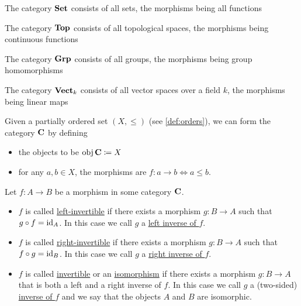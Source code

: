 \begin{definition}\label{def:standard_categories}
  \begin{defenum}
    \item\label{def:standard_categories/set} The category $\operatorname{\mathbf{Set}}$ consists of all sets, the morphisms being all functions
    \item\label{def:standard_categories/top} The category $\operatorname{\mathbf{Top}}$ consists of all topological spaces, the morphisms being continuous functions
    \item\label{def:standard_categories/grp} The category $\operatorname{\mathbf{Grp}}$ consists of all groups, the morphisms being group homomorphisms
    \item\label{def:standard_categories/vect} The category $\operatorname{\mathbf{Vect}}_k$ consists of all vector spaces over a field $k$, the morphisms being linear maps
    \item\label{def:standard_categories/ord} Given a partially ordered set $(X, \leq)$ (see \cref{def:orders}), we can form the category $\operatorname{\mathbf{C}}$ by defining
    \begin{itemize}
      \item the objects to be $\operatorname{obj} \operatorname{\mathbf{C}} \coloneqq X$
      \item for any $a, b \in X$, the morphisms are $f: a \to b \iff a \leq b$.
    \end{itemize}
  \end{defenum}
\end{definition}

\begin{definition}\label{def:morphism_invertability}
  Let $f: A \to B$ be a morphism in some category $\operatorname{\mathbf{C}}$.

  \begin{itemize}
    \item $f$ is called \uline{left-invertible} if there exists a morphism $g: B \to A$ such that $g \circ f = \operatorname{id}_A$. In this case we call $g$ a \uline{left inverse of $f$}.

    \item $f$ is called \uline{right-invertible} if there exists a morphism $g: B \to A$ such that $f \circ g = \operatorname{id}_B$. In this case we call $g$ a \uline{right inverse of $f$}.

    \item $f$ is called \uline{invertible} or an \uline{isomorphism} if there exists a morphism $g: B \to A$ that is both a left and a right inverse of $f$. In this case we call $g$ a (two-sided) \uline{inverse of $f$} and we say that the objects $A$ and $B$ are isomorphic.
  \end{itemize}
\end{definition}

